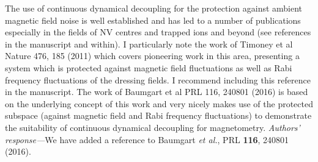 \documentclass[letterpaper]{article}
\newenvironment{refcomment}{\singlespacing\verbatim}{\endverbatim}
\newcommand{\response}{\emph{Authors' response---}}
\begin{document}
\begin{refcomment}
The use of continuous dynamical decoupling for the protection against 
ambient magnetic field noise is well established and has led to a 
number of publications especially in the fields of NV centres and 
trapped ions and beyond (see references in the manuscript and within).
I particularly note the work of Timoney et al Nature 476, 185 (2011) 
which covers pioneering work in this area, presenting a system which 
is protected against magnetic field fluctuations as well as Rabi 
frequency fluctuations of the dressing fields. I recommend including 
this reference in the manuscript. The work of Baumgart et al PRL 116, 
240801 (2016) is based on the underlying concept of this work and very
nicely makes use of the protected subspace (against magnetic field and
Rabi frequency fluctuations) to demonstrate the suitability of 
continuous dynamical decoupling for magnetometry.
\end{refcomment}
\response We have added a reference to Baumgart \textit{et al.}, PRL \textbf{116}, 240801 (2016).
\end{document}
